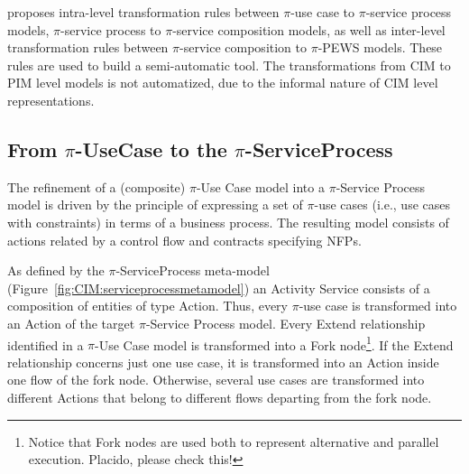 


\pisodm  proposes intra-level transformation rules between $\pi$-use case to $\pi$-service process models, $\pi$-service process to $\pi$-service composition  models, as well as inter-level transformation rules between $\pi$-service composition to $\pi$-PEWS models. 
These rules are used to build a semi-automatic tool.
The transformations from CIM to PIM level models is not automatized, due to the informal nature of CIM level representations.
 
\subsection{From $\pi$-UseCase to the $\pi$-ServiceProcess}

The refinement of a (composite) $\pi$-Use Case model into a $\pi$-Service Process model is driven by the principle of expressing a set of $\pi$-use cases (i.e., use cases with constraints)   in terms of  a business process.
The resulting model consists of actions related by a control flow and contracts specifying NFPs. 

As defined by the $\pi$-ServiceProcess  meta-model (Figure~\ref{fig:CIM:serviceprocessmetamodel}) an {\sc Activity Service} consists of a composition of  entities of type {\sc Action}. 
Thus, every {\sf $\pi$-use case} is transformed into an {\sf Action} of the target $\pi$-Service Process model.  
Every {\sf Extend} relationship identified in a $\pi$-Use Case model is transformed into a  {\sf Fork node}\footnote{Notice that Fork nodes are used both to represent alternative and parallel execution. {\color{red} \sc Placido, please check this!}}.
If the {\sf Extend} relationship concerns just one {\sf use case}, it is transformed into an {\sf Action} inside one flow of the fork node. 
Otherwise, several  {\sf use cases} are transformed into different {\sf Actions} that belong to different flows departing from the fork node.   

